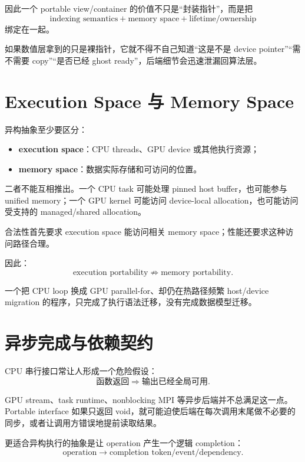 因此一个 portable view/container 的价值不只是“封装指针”，而是把
\begin{equation}
\boxed{
\text{indexing semantics}
+
\text{memory space}
+
\text{lifetime/ownership}
}
\end{equation}
绑定在一起。

如果数值层拿到的只是裸指针，它就不得不自己知道“这是不是 device pointer”“需不需要 copy”“是否已经 ghost ready”，后端细节会迅速泄漏回算法层。

\section{Execution Space 与 Memory Space}

异构抽象至少要区分：
\begin{itemize}
\item \textbf{execution space}：CPU threads、GPU device 或其他执行资源；
\item \textbf{memory space}：数据实际存储和可访问的位置。
\end{itemize}

二者不能互相推出。一个 CPU task 可能处理 pinned host buffer，也可能参与 unified memory；一个 GPU kernel 可能访问 device-local allocation，也可能访问受支持的 managed/shared allocation。

合法性首先要求 execution space 能访问相关 memory space；性能还要求这种访问路径合理。

因此：
\begin{equation}
\boxed{
\text{execution portability}
\not\Rightarrow
\text{memory portability}.
}
\end{equation}

一个把 CPU loop 换成 GPU parallel-for、却仍在热路径频繁 host/device migration 的程序，只完成了执行语法迁移，没有完成数据模型迁移。

\section{异步完成与依赖契约}

CPU 串行接口常让人形成一个危险假设：
\begin{equation}
\text{函数返回}
\Rightarrow
\text{输出已经全局可用}.
\end{equation}

GPU stream、task runtime、nonblocking MPI 等异步后端并不总满足这一点。Portable interface 如果只返回 void，就可能迫使后端在每次调用末尾做不必要的同步，或者让调用方错误地提前读取结果。

更适合异构执行的抽象是让 operation 产生一个逻辑 completion：
\begin{equation}
\text{operation}
\longrightarrow
\text{completion token/event/dependency}.
\label{eq:portability-completion}
\end{equation}

